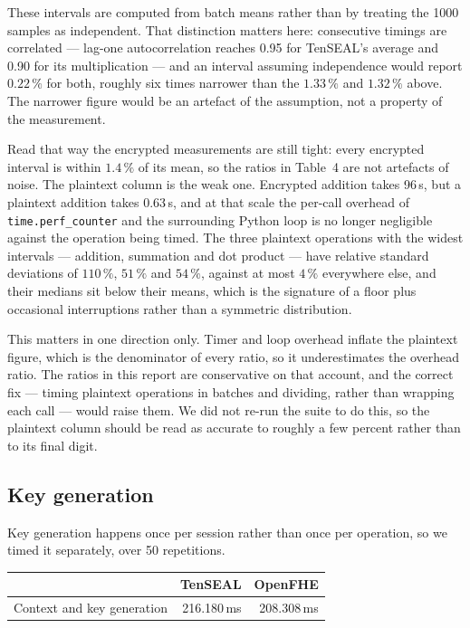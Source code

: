 \documentclass[11pt,a4paper]{article}
\begin{document}
These intervals are computed from batch means rather than by treating the 1000
samples as independent. That distinction matters here: consecutive timings are
correlated --- lag-one autocorrelation reaches 0.95 for TenSEAL's average and 0.90
for its multiplication --- and an interval assuming independence would report
$0.22\,\%$ for both, roughly six times narrower than the $1.33\,\%$ and $1.32\,\%$
above. The narrower figure would be an artefact of the assumption, not a property of
the measurement.

Read that way the encrypted measurements are still tight: every encrypted interval
is within $1.4\,\%$ of its mean, so the ratios in Table~4 are not artefacts of
noise. The
plaintext column is the weak one. Encrypted addition takes 96\,\textmu s, but a
plaintext addition takes 0.63\,\textmu s, and at that scale the per-call overhead of
\texttt{time.perf\_counter} and the surrounding Python loop is no longer negligible
against the operation being timed. The three plaintext operations with the widest
intervals --- addition, summation and dot product --- have relative standard
deviations of $110\,\%$, $51\,\%$ and $54\,\%$, against at most $4\,\%$ everywhere
else, and their medians sit below their means, which is the signature of a floor
plus occasional interruptions rather than a symmetric distribution.

This matters in one direction only. Timer and loop overhead inflate the plaintext
figure, which is the denominator of every ratio, so it underestimates the overhead ratio. The ratios in this report are conservative on that
account, and the correct fix --- timing plaintext operations in batches and dividing,
rather than wrapping each call --- would raise them. We did not re-run the suite to
do this, so the plaintext column should be read as accurate to roughly a few percent
rather than to its final digit.

\subsection{Key generation}

Key generation happens once per session rather than once per operation, so we timed
it separately, over 50 repetitions.

\begin{table}[H]\centering\small
\begin{tabular}{@{}lrr@{}}
\toprule
 & \textbf{TenSEAL} & \textbf{OpenFHE} \\
\midrule
Context and key generation & 216.180\,ms & 208.308\,ms \\
\bottomrule
\end{tabular}
\end{table}
\end{document}
